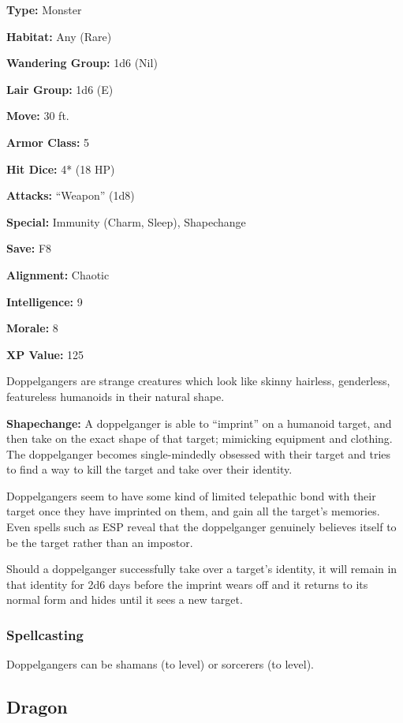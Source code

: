 \begin{multicols*}{2}
{\textbf{Type:} Monster

\textbf{Habitat:} Any (Rare)

\textbf{Wandering Group:} 1d6 (Nil)

\textbf{Lair Group:} 1d6 (E)

\textbf{Move:} 30 ft.

\textbf{Armor Class:} 5

\textbf{Hit Dice:} 4* (18 HP)

\textbf{Attacks:} “Weapon” (1d8)

\textbf{Special:} Immunity (Charm, Sleep), Shapechange

\textbf{Save:} F8

\textbf{Alignment:} Chaotic

\textbf{Intelligence:} 9

\textbf{Morale:} 8

\textbf{XP Value:} 125}

Doppelgangers are strange creatures which look like skinny hairless, genderless, featureless humanoids in their natural shape.

\textbf{Shapechange:} A doppelganger is able to “imprint” on a humanoid target, and then take on the exact shape of that target; mimicking equipment and clothing. The doppelganger becomes single-mindedly obsessed with their target and tries to find a way to kill the target and take over their identity.

Doppelgangers seem to have some kind of limited telepathic bond with their target once they have imprinted on them, and gain all the target’s memories. Even spells such as ESP reveal that the doppelganger genuinely believes itself to be the target rather than an impostor.

Should a doppelganger successfully take over a target’s identity, it will remain in that identity for 2d6 days before the imprint wears off and it returns to its normal form and hides until it sees a new target.

\subsubsection{Spellcasting}
Doppelgangers can be shamans (to  level) or sorcerers (to  level).

\subsection{Dragon}
\end{multicols*}
